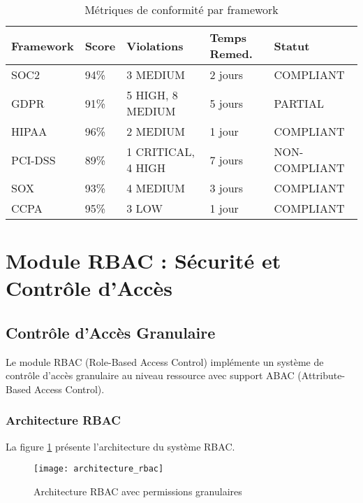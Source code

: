 \begin{table}[htpb]
\centering
\caption{Métriques de conformité par framework}
\label{tab:metriques_conformite}
\begin{tabular}{|p{}|p{}|p{}|p{}|p{}|}
\hline
\textbf{Framework} & \textbf{Score} & \textbf{Violations} & \textbf{Temps Remed.} & \textbf{Statut} \\
\hline
SOC2 & 94\% & 3 MEDIUM & 2 jours & COMPLIANT \\
\hline
GDPR & 91\% & 5 HIGH, 8 MEDIUM & 5 jours & PARTIAL \\
\hline
HIPAA & 96\% & 2 MEDIUM & 1 jour & COMPLIANT \\
\hline
PCI-DSS & 89\% & 1 CRITICAL, 4 HIGH & 7 jours & NON-COMPLIANT \\
\hline
SOX & 93\% & 4 MEDIUM & 3 jours & COMPLIANT \\
\hline
CCPA & 95\% & 3 LOW & 1 jour & COMPLIANT \\
\hline
\end{tabular}
\end{table}

\section{Module RBAC : Sécurité et Contrôle d'Accès}

\subsection{Contrôle d'Accès Granulaire}

Le module RBAC (Role-Based Access Control) implémente un système de contrôle d'accès granulaire au niveau ressource avec support ABAC (Attribute-Based Access Control).

\subsubsection{Architecture RBAC}

La figure \ref{fig:architecture_rbac} présente l'architecture du système RBAC.

\begin{figure}[htpb]
\centering
\texttt{[image: architecture\_rbac]}
\caption{Architecture RBAC avec permissions granulaires}
\label{fig:architecture_rbac}
\end{figure}

